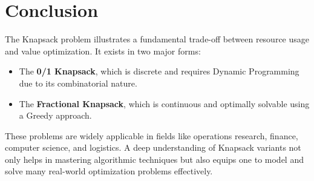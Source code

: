 \documentclass[14pt]{extarticle}
\begin{document}
\section{Conclusion}

The Knapsack problem illustrates a fundamental trade-off between resource usage and value optimization. 
It exists in two major forms:

\begin{itemize}
    \item The \textbf{0/1 Knapsack}, which is discrete and requires Dynamic Programming due to its combinatorial nature.
    \item The \textbf{Fractional Knapsack}, which is continuous and optimally solvable using a Greedy approach.
\end{itemize}

These problems are widely applicable in fields like operations research, finance, computer science, and logistics. 
A deep understanding of Knapsack variants not only helps in mastering algorithmic techniques but also equips one to 
model and solve many real-world optimization problems effectively.
\end{document}
